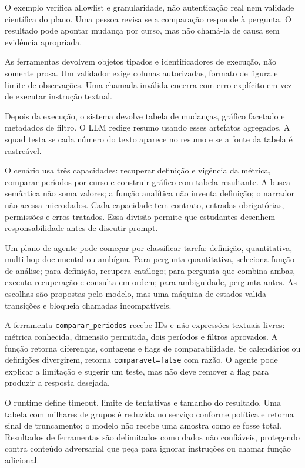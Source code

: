 O exemplo verifica allowlist e granularidade, não autenticação real nem validade científica do plano. Uma pessoa revisa se a comparação responde à pergunta. O resultado pode apontar mudança por curso, mas não chamá-la de causa sem evidência apropriada.

As ferramentas devolvem objetos tipados e identificadores de execução, não somente prosa. Um validador exige colunas autorizadas, formato de figura e limite de observações. Uma chamada inválida encerra com erro explícito em vez de executar instrução textual.

Depois da execução, o sistema devolve tabela de mudanças, gráfico facetado e metadados de filtro. O LLM redige resumo usando esses artefatos agregados. A squad testa se cada número do texto aparece no resumo e se a fonte da tabela é rastreável.

O cenário usa três capacidades: recuperar definição e vigência da métrica, comparar períodos por curso e construir gráfico com tabela resultante. A busca semântica não soma valores; a função analítica não inventa definição; o narrador não acessa microdados. Cada capacidade tem contrato, entradas obrigatórias, permissões e erros tratados. Essa divisão permite que estudantes desenhem responsabilidade antes de discutir prompt.

Um plano de agente pode começar por classificar tarefa: definição, quantitativa, multi-hop documental ou ambígua. Para pergunta quantitativa, seleciona função de análise; para definição, recupera catálogo; para pergunta que combina ambas, executa recuperação e consulta em ordem; para ambiguidade, pergunta antes. As escolhas são propostas pelo modelo, mas uma máquina de estados valida transições e bloqueia chamadas incompatíveis.

A ferramenta \texttt{comparar\_periodos} recebe IDs e não expressões textuais livres: métrica conhecida, dimensão permitida, dois períodos e filtros aprovados. A função retorna diferenças, contagens e flags de comparabilidade. Se calendários ou definições divergirem, retorna \texttt{comparavel=false} com razão. O agente pode explicar a limitação e sugerir um teste, mas não deve remover a flag para produzir a resposta desejada.

O runtime define timeout, limite de tentativas e tamanho do resultado. Uma tabela com milhares de grupos é reduzida no serviço conforme política e retorna sinal de truncamento; o modelo não recebe uma amostra como se fosse total. Resultados de ferramentas são delimitados como dados não confiáveis, protegendo contra conteúdo adversarial que peça para ignorar instruções ou chamar função adicional.

